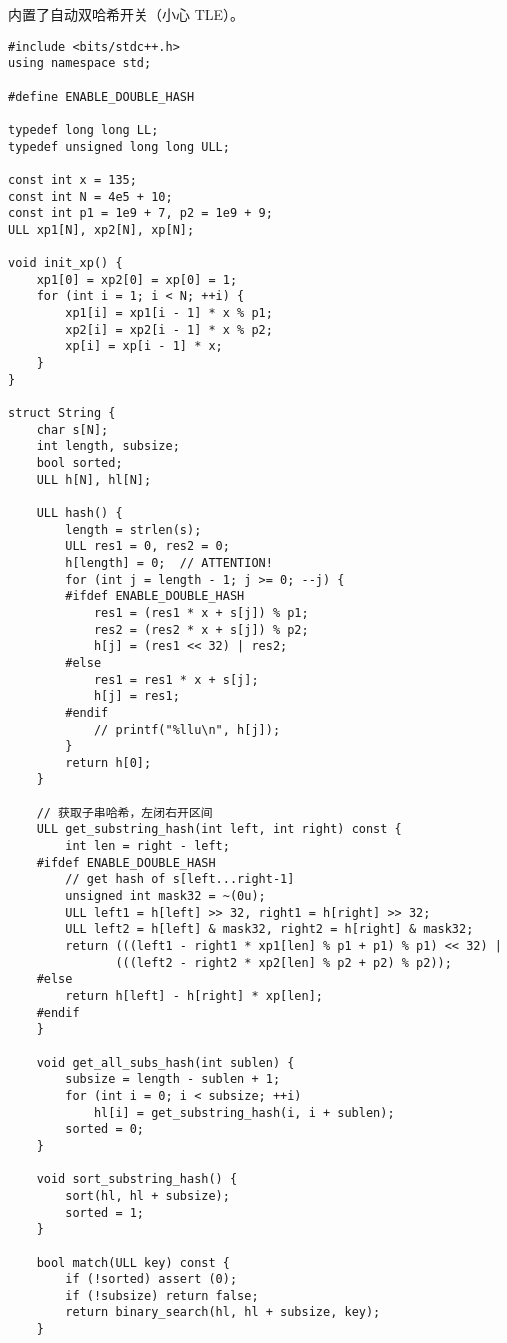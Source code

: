 \documentclass[]{article}
\begin{document}
内置了自动双哈希开关（小心 TLE）。

\begin{verbatim}
#include <bits/stdc++.h>
using namespace std;

#define ENABLE_DOUBLE_HASH

typedef long long LL;
typedef unsigned long long ULL;

const int x = 135;
const int N = 4e5 + 10;
const int p1 = 1e9 + 7, p2 = 1e9 + 9;
ULL xp1[N], xp2[N], xp[N];

void init_xp() {
    xp1[0] = xp2[0] = xp[0] = 1;
    for (int i = 1; i < N; ++i) {
        xp1[i] = xp1[i - 1] * x % p1;
        xp2[i] = xp2[i - 1] * x % p2;
        xp[i] = xp[i - 1] * x;
    }
}

struct String {
    char s[N];
    int length, subsize;
    bool sorted;
    ULL h[N], hl[N];

    ULL hash() {
        length = strlen(s);
        ULL res1 = 0, res2 = 0;
        h[length] = 0;  // ATTENTION!
        for (int j = length - 1; j >= 0; --j) {
        #ifdef ENABLE_DOUBLE_HASH
            res1 = (res1 * x + s[j]) % p1;
            res2 = (res2 * x + s[j]) % p2;
            h[j] = (res1 << 32) | res2;
        #else
            res1 = res1 * x + s[j];
            h[j] = res1;
        #endif
            // printf("%llu\n", h[j]);
        }
        return h[0];
    }

    // 获取子串哈希，左闭右开区间
    ULL get_substring_hash(int left, int right) const {
        int len = right - left;
    #ifdef ENABLE_DOUBLE_HASH
        // get hash of s[left...right-1]
        unsigned int mask32 = ~(0u);
        ULL left1 = h[left] >> 32, right1 = h[right] >> 32;
        ULL left2 = h[left] & mask32, right2 = h[right] & mask32;
        return (((left1 - right1 * xp1[len] % p1 + p1) % p1) << 32) |
               (((left2 - right2 * xp2[len] % p2 + p2) % p2));
    #else
        return h[left] - h[right] * xp[len];
    #endif
    }

    void get_all_subs_hash(int sublen) {
        subsize = length - sublen + 1;
        for (int i = 0; i < subsize; ++i)
            hl[i] = get_substring_hash(i, i + sublen);
        sorted = 0;
    }

    void sort_substring_hash() {
        sort(hl, hl + subsize);
        sorted = 1;
    }

    bool match(ULL key) const {
        if (!sorted) assert (0);
        if (!subsize) return false;
        return binary_search(hl, hl + subsize, key);
    }


\end{verbatim}
\end{document}
